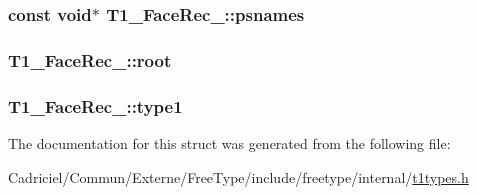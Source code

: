 \hypertarget{struct_t1___face_rec___ad685d33071eb00bfe3c9b7d3b91f7405}{
\subsubsection[{psnames}]{\setlength{\rightskip}{0pt plus 5cm}const {\bf void}$\ast$ T1\-\_\-\-Face\-Rec\-\_\-\-::psnames}}\label{struct_t1___face_rec___ad685d33071eb00bfe3c9b7d3b91f7405}
\hypertarget{struct_t1___face_rec___a43be05c1ded91ee98e851f285b97f2e8}{
\subsubsection[{root}]{ T1\-\_\-\-Face\-Rec\-\_\-\-::root}}\label{struct_t1___face_rec___a43be05c1ded91ee98e851f285b97f2e8}
\hypertarget{struct_t1___face_rec___aa1b8f09752d662d2dca26ed8bc00d782}{
\subsubsection[{type1}]{ T1\-\_\-\-Face\-Rec\-\_\-\-::type1}}\label{struct_t1___face_rec___aa1b8f09752d662d2dca26ed8bc00d782}


The documentation for this struct was generated from the following file\-:\begin{DoxyCompactItemize}
\item 
Cadriciel/\-Commun/\-Externe/\-Free\-Type/include/freetype/internal/\hyperlink{t1types_8h}{t1types.\-h}\end{DoxyCompactItemize}
